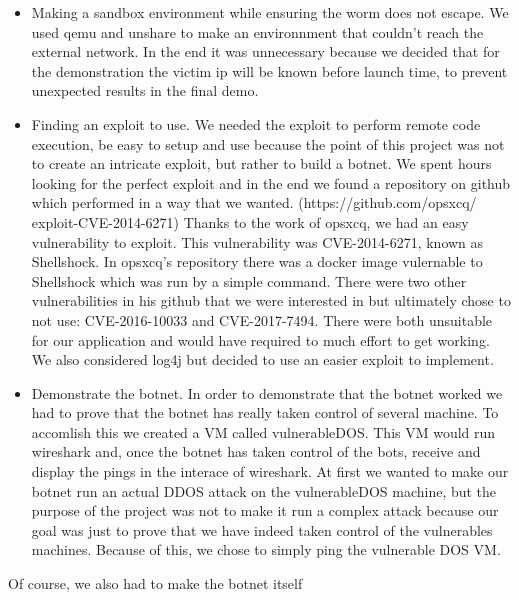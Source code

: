 \documentclass[../main.tex]{subfiles}
\begin{document}
    \begin{itemize}

        \item Making a sandbox environment while ensuring the worm does not escape.
        We used qemu and unshare to make an environnment that couldn't reach the external network.
        In the end it was unnecessary because we decided that for the demonstration the victim ip will be known before launch time, to prevent unexpected results in the final demo. 

        \item Finding an exploit to use.
        We needed the exploit to perform remote code execution, be easy to setup and use because the point of this project was not to create an intricate exploit, but rather to build a botnet.
        We spent hours looking for the perfect exploit and in the end we found a repository on github which performed in a way that we wanted.
        (https://github.com/opsxcq/
        exploit-CVE-2014-6271)
        Thanks to the work of opsxcq, we had an easy vulnerability to exploit.
        This vulnerability was CVE-2014-6271, known as Shellshock.
        In opsxcq's repository there was a docker image vulernable to Shellshock which was run by a simple command.
        There were two other vulnerabilities in his github that we were interested in but ultimately chose to not use: CVE-2016-10033 and CVE-2017-7494.
        There were both unsuitable for our application and would have required to much effort to get working. 
        We also considered log4j but decided to use an easier exploit to implement.

        \item Demonstrate the botnet.
        In order to demonstrate that the botnet worked we had to prove that the botnet has really taken control of several machine.
        To accomlish this we created a VM called vulnerableDOS. This VM would run wireshark and, once the botnet has taken control of the bots, receive and display the pings in the interace of wireshark.
        At first we wanted to make our botnet run an actual DDOS attack on the vulnerableDOS machine, but the purpose of the project was not to make it run a complex attack because our goal was just to prove that we have indeed taken control of the vulnerables machines. Because of this, we chose to simply ping the vulnerable DOS VM.

    \end{itemize}

    Of course, we also had to make the botnet itself 
\end{document}
